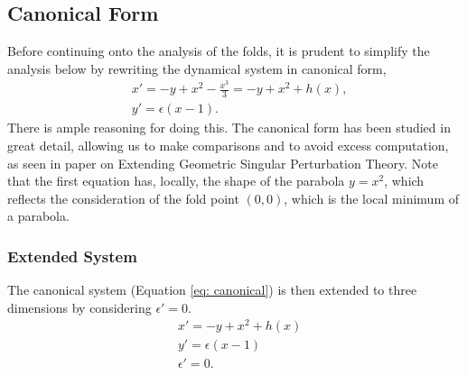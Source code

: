 \subsection{Canonical Form}
Before continuing onto the analysis of the folds, it is prudent to simplify the analysis below by rewriting the dynamical system in canonical form,
\begin{equation}
\begin{aligned}
&x'=-y+x^2-\frac{x^3}{3}=-y+x^2+h(x), \\
&y'=\epsilon(x-1).
\end{aligned}
\label{eq: canonical}
\end{equation}
There is ample reasoning for doing this. The canonical form has been studied in great detail, allowing us to make comparisons and to avoid excess computation, as seen in \citet{krupa2001} paper on Extending Geometric Singular Perturbation Theory.  Note that the first equation has, locally, the shape of the parabola $y= x^2$, which reflects the consideration of the fold point $(0,0)$, which is the local minimum of a parabola.


\subsubsection{Extended System} \label{sec: extended sys blowup}
The canonical system (Equation \ref{eq: canonical}) is then extended to three dimensions by considering $\epsilon'=0$. 
\begin{equation} \label{extended FS}
\begin{aligned}
&x'=-y+x^2+h(x) \\
&y'=\epsilon(x-1)\\
&\epsilon'=0.
\end{aligned}
\end{equation}


